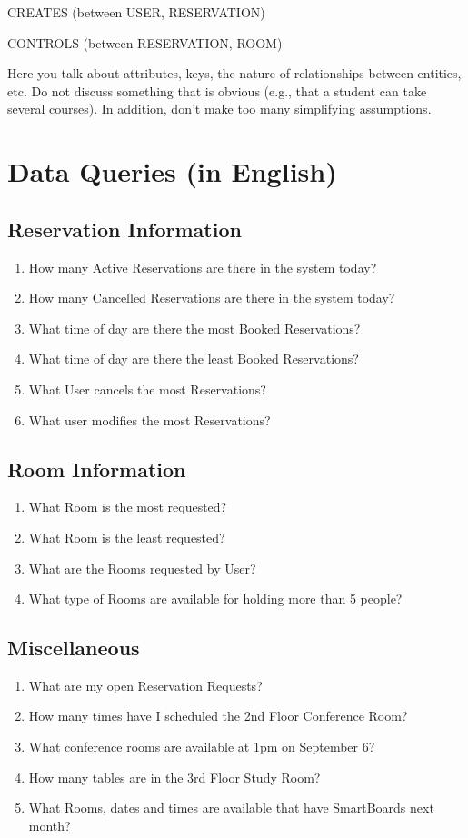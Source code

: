 \documentclass[11pt]{report}
\begin{document}
 CREATES (between USER, RESERVATION)
 
 CONTROLS (between RESERVATION, ROOM)
 
 

Here you talk about attributes,
 keys, the nature of relationships between entities, etc. Do not 
discuss something that is obvious (e.g.,
 that a student can take several courses). In addition,
don't make too many simplifying assumptions.


\section*{Data Queries (in English)}
\subsection*{Reservation Information}
\begin{enumerate}
\item How many Active Reservations are there in the system today?
\item How many Cancelled Reservations are there in the system today?
\item What time of day are there the most Booked Reservations?
\item What time of day are there the least Booked Reservations?
\item What User cancels the most Reservations?
\item What user modifies the most Reservations?
\end{enumerate}

\subsection*{Room Information}
\begin{enumerate}
\item What Room is the most requested?
\item What Room is the least requested?
\item What are the Rooms requested by User?
\item What type of Rooms are available for holding more than 5 people?
\end{enumerate}

\subsection*{Miscellaneous}
\begin{enumerate}
\item What are my open Reservation Requests?
\item How many times have I scheduled the 2nd Floor Conference Room?
\item What conference rooms are available at 1pm on September 6?
\item How many tables are in the 3rd Floor Study Room?
\item What Rooms, dates and times are available that have SmartBoards next month?
\end{enumerate}
\end{document}

